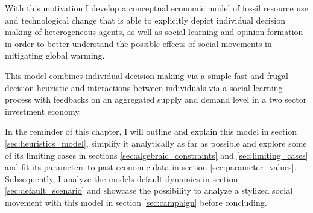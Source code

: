 With this motivation I develop a conceptual economic model of fossil resource use and technological change that is able to explicitly depict individual decision making of heterogeneous agents, as well as social learning and opinion formation in order to better understand the possible effects of social movements in mitigating global warming.

This model combines individual decision making via a simple fast and frugal decision heuristic and interactions between individuals via a social learning process with feedbacks on an aggregated supply and demand level in a two sector investment economy.

In the reminder of this chapter, I will outline and explain this model in section \ref{sec:heuristics_model}, simplify it analytically as far as possible and explore some of its limiting cases in sections \ref{sec:algebraic_constraints} and \ref{sec:limiting_cases} and fit its parameters to past economic data in section \ref{sec:parameter_values}. Subsequently, I analyze the models default dynamics in section \ref{sec:default_scenario} and showcase the possibility to analyze a stylized social movement with this model in section \ref{sec:campaign} before concluding.

